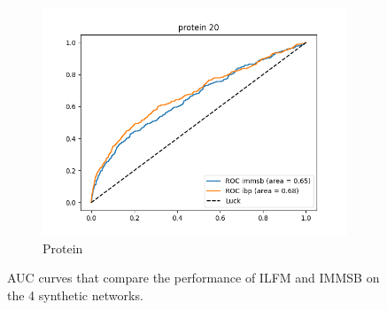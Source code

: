 \begin{figure}[h]
\begin{subfigure}[b]{0.300\textwidth}
            \includegraphics[width=\textwidth]{img/corpus/roc_protein_20}
            \caption {{\small Protein}}    
            \label{fig:mean and std of net14}
        \end{subfigure}
	\caption{AUC curves that compare the performance of ILFM and IMMSB on the 4 synthetic networks.}
	\label{fig:auc}
\end{figure}
